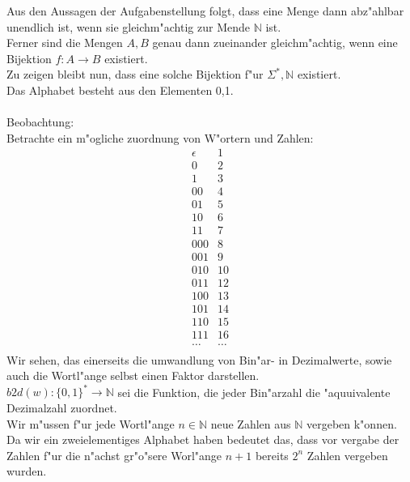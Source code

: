 \documentclass{article}
\newcommand{\ra}{\rightarrow}
\newcommand{\eps}{\epsilon}
\begin{document}
\subsubsection{}
Aus den Aussagen der Aufgabenstellung folgt, dass eine Menge dann abz"ahlbar
    unendlich ist, wenn sie gleichm"achtig zur Mende $\mathbb{N}$ ist.\\
Ferner sind die Mengen $A, B$ genau dann zueinander gleichm"achtig, wenn eine
    Bijektion $f: A \ra B$ existiert.\\
Zu zeigen bleibt nun, dass eine solche Bijektion f"ur $\Sigma^*, \mathbb{N}$
    existiert.\\
Das Alphabet besteht aus den Elementen 0,1.\\
\\
Beobachtung:\\
Betrachte ein m"ogliche zuordnung von W"ortern und Zahlen:\[
    \begin{array}{ll}
        \eps    &1\\
        0       &2\\
        1       &3\\
        00      &4\\
        01      &5\\
        10      &6\\
        11      &7\\
        000     &8\\
        001     &9\\
        010     &10\\
        011     &12\\
        100     &13\\
        101     &14\\
        110     &15\\
        111     &16\\
        \ldots  &\ldots\\
    \end{array}
    \]
Wir sehen, das einerseits die umwandlung von Bin"ar- in Dezimalwerte, sowie
    auch die Wortl"ange selbst einen Faktor darstellen.\\
$b2d(w): \{0,1\}^* \ra \mathbb{N}$ sei die Funktion, die jeder Bin"arzahl die
    "aquuivalente Dezimalzahl zuordnet.\\
Wir m"ussen f"ur jede Wortl"ange $n \in \mathbb{N}$ neue Zahlen aus $\mathbb{N}$
    vergeben k"onnen. Da wir ein zweielementiges Alphabet haben bedeutet das,
    dass vor vergabe der Zahlen f"ur die n"achst gr"o"sere 
    Worl"ange $n+1$ bereits $2^n$ Zahlen vergeben wurden.
\end{document}
